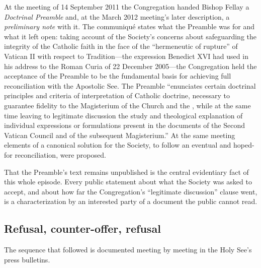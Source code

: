 At the meeting of 14 September 2011 the Congregation handed Bishop Fellay
a \textit{Doctrinal Preamble} and, at the March 2012 meeting's later
description, a \textit{preliminary note} with it. The communiqué states
what the Preamble was for and what it left open: taking account of the
Society's concerns about safeguarding the integrity of the Catholic faith
in the face of the ``hermeneutic of rupture'' of Vatican II with respect
to Tradition---the expression Benedict XVI had used in his address to the
Roman Curia of 22 December 2005---the Congregation held the acceptance of
the Preamble to be the fundamental basis for achieving full
reconciliation with the Apostolic See. The Preamble ``enunciates certain
doctrinal principles and criteria of interpretation of Catholic doctrine,
necessary to guarantee fidelity to the Magisterium of the Church and the
, while at the same time leaving to legitimate
discussion the study and theological explanation of individual
expressions or formulations present in the documents of the Second
Vatican Council and of the subsequent Magisterium.'' At the same meeting
elements of a canonical solution for the Society, to follow an eventual
and hoped-for reconciliation, were proposed.

That the Preamble's text remains unpublished is the central evidentiary
fact of this whole episode. Every public statement about what the Society
was asked to accept, and about how far the Congregation's ``legitimate
discussion'' clause went, is a characterization by an interested party of
a document the public cannot read.

\subsection{Refusal, counter-offer, refusal}

The sequence that followed is documented meeting by meeting in the Holy
See's press bulletins.

